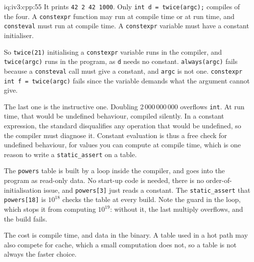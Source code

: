 \begin{solution}{iq:iv3:cpp:55}
It prints \texttt{42 2 42 1000}. Only \texttt{int d = twice(argc);} compiles of the four. A \texttt{constexpr} function may run at compile time or at run time, and \texttt{consteval} must run at compile time. A \texttt{constexpr} variable must have a constant initialiser.

So \texttt{twice(21)} initialising a \texttt{constexpr} variable runs in the compiler, and \texttt{twice(argc)} runs in the program, as \texttt{d} needs no constant. \texttt{always(argc)} fails because a \texttt{consteval} call must give a constant, and \texttt{argc} is not one. \texttt{constexpr int f = twice(argc)} fails since the variable demands what the argument cannot give.

The last one is the instructive one. Doubling 2\,000\,000\,000 overflows \texttt{int}. At run time, that would be undefined behaviour, compiled silently. In a constant expression, the standard disqualifies any operation that would be undefined, so the compiler must diagnose it. Constant evaluation is thus a free check for undefined behaviour, for values you can compute at compile time, which is one reason to write a \texttt{static\_assert} on a table.

The \texttt{powers} table is built by a loop inside the compiler, and goes into the program as read-only data. No start-up code is needed, there is no order-of-initialisation issue, and \texttt{powers[3]} just reads a constant. The \texttt{static\_assert} that \texttt{powers[18]} is $10^{18}$ checks the table at every build. Note the guard in the loop, which stops it from computing $10^{19}$: without it, the last multiply overflows, and the build fails.

The cost is compile time, and data in the binary. A table used in a hot path may also compete for cache, which a small computation does not, so a table is not always the faster choice.

\end{solution}

